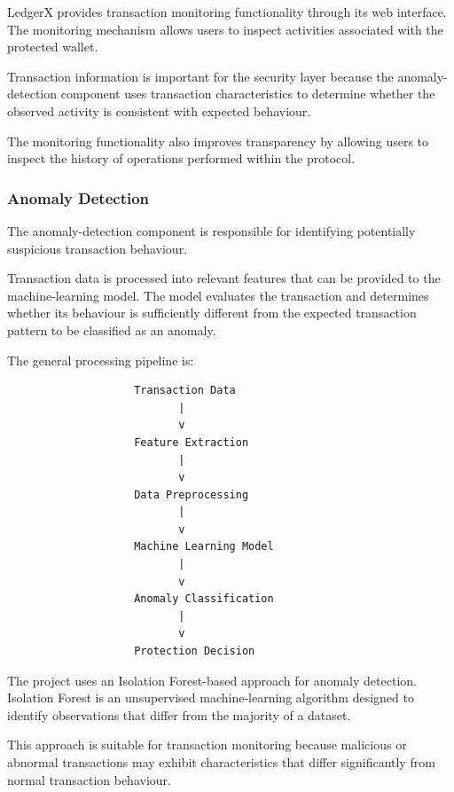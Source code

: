 \documentclass{tietreport}
\begin{document}
LedgerX provides transaction monitoring functionality through its
web interface. The monitoring mechanism allows users to inspect
activities associated with the protected wallet.

Transaction information is important for the security layer because
the anomaly-detection component uses transaction characteristics to
determine whether the observed activity is consistent with expected
behaviour.

The monitoring functionality also improves transparency by allowing
users to inspect the history of operations performed within the
protocol.

\subsubsection{Anomaly Detection}

The anomaly-detection component is responsible for identifying
potentially suspicious transaction behaviour.

Transaction data is processed into relevant features that can be
provided to the machine-learning model. The model evaluates the
transaction and determines whether its behaviour is sufficiently
different from the expected transaction pattern to be classified as
an anomaly.

The general processing pipeline is:

\begin{verbatim}
                    Transaction Data
                           |
                           v
                    Feature Extraction
                           |
                           v
                    Data Preprocessing
                           |
                           v
                    Machine Learning Model
                           |
                           v
                    Anomaly Classification
                           |
                           v
                    Protection Decision
\end{verbatim}

The project uses an Isolation Forest-based approach for anomaly
detection. Isolation Forest is an unsupervised machine-learning
algorithm designed to identify observations that differ from the
majority of a dataset.

This approach is suitable for transaction monitoring because
malicious or abnormal transactions may exhibit characteristics that
differ significantly from normal transaction behaviour.
\end{document}
